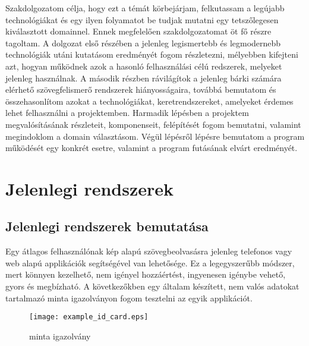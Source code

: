 \documentclass[12pt]{report}
\begin{document}
Szakdolgozatom célja, hogy ezt a témát körbejárjam, felkutassam a legújabb technológiákat és egy ilyen folyamatot be tudjak mutatni egy tetszőlegesen kiválasztott domainnel.
\newline
Ennek megfelelően szakdolgozatomat öt fő részre tagoltam. A dolgozat első részében a jelenleg legismertebb és legmodernebb technológiák utáni kutatásom eredményét fogom részletezni, mélyebben kifejteni azt, hogyan működnek azok a hasonló felhasználási célú redszerek, melyeket jelenleg használnak. A második részben rávilágítok a jelenleg bárki számára elérhető szövegfelismerő rendszerek hiányosságaira, továbbá bemutatom és összehasonlítom azokat a technológiákat, keretrendszereket, amelyeket érdemes lehet felhasználni a projektemben. Harmadik lépésben a projektem megvalósításának részleteit, komponenseit, felépítését fogom bemutatni, valamint megindoklom a domain választásom. Végül lépésről lépésre bemutatom a program működését egy konkrét esetre, valamint a program futásának elvárt eredményét.



\chapter{Jelenlegi rendszerek}
\section{Jelenlegi rendszerek bemutatása}

Egy átlagos felhasználónak kép alapú szövegbeolvasásra jelenleg telefonos vagy web alapú applikációk segítségével van lehetősége. Ez a legegyszerűbb módszer, mert könnyen kezelhető, nem igényel hozzáértést, ingyenesen igénybe vehető, gyors és megbízható. A következőkben egy általam készített, nem valós adatokat tartalmazó minta igazolványon fogom tesztelni az egyik applikációt.

\newline

\begin{figure}[h]
  \centerline{\texttt{[image: example\_id\_card.eps]}}
  \caption{minta igazolvány}
\end{figure}

\pagebreak
\end{document}
